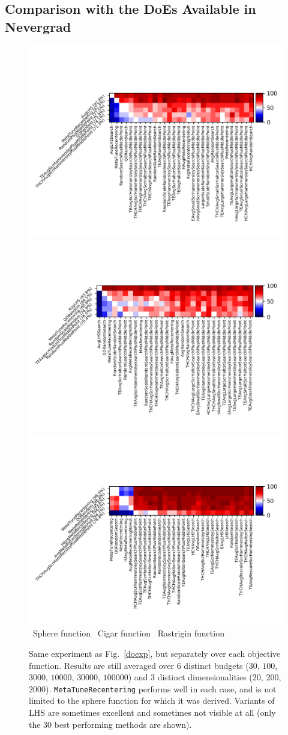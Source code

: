 \subsection{Comparison with the DoEs Available in Nevergrad}%
\label{rg}
%
\begin{figure}[t]
    \centering
\includegraphics[trim={30 25 12 80}, clip,width=.32\textwidth]{sections/appendix/ppsn2020-rescaling/figures/fight_namesphere}      \includegraphics[trim={30 25 12 80}, clip,width=.32\textwidth]{sections/appendix/ppsn2020-rescaling/figures/fight_namecigar.png}     
\includegraphics[trim={30 25 12 80}, clip,width=.32\textwidth]{sections/appendix/ppsn2020-rescaling/figures/fight_namerastrigin.png}   \\ 
~\hfill Sphere function\hfill ~ \hfill Cigar function\hfill ~ \hfill Rastrigin function\hfill ~\\
\caption{Same experiment as Fig.~\ref{doexp}, but separately over each objective function. Results are still averaged over 6 distinct budgets ($30$, $100$, $3000$, $10000$, $30000$, $100000$) and 3 distinct dimensionalities ($20$, $200$, $2000$). {\texttt{MetaTuneRecentering} performs well in each case, and is not limited to the sphere function for which it was derived. Variants of LHS are sometimes excellent and sometimes not visible at all (only the 30 best performing methods are shown).}}
    \label{toto3}
\end{figure}


